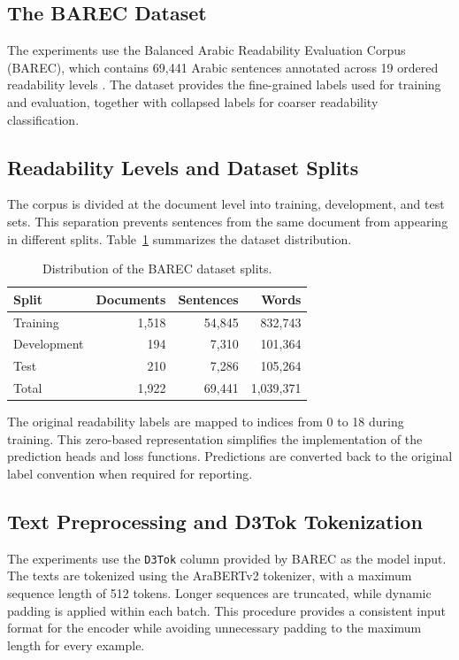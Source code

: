 \subsection{The BAREC Dataset}

The experiments use the Balanced Arabic Readability Evaluation Corpus (BAREC), which contains 69,441 Arabic sentences annotated across 19 ordered readability levels \cite{elmadani2025barec}. The dataset provides the fine-grained labels used for training and evaluation, together with collapsed labels for coarser readability classification.

\subsection{Readability Levels and Dataset Splits}

The corpus is divided at the document level into training, development, and test sets. This separation prevents sentences from the same document from appearing in different splits. Table~\ref{tab:meth-splits} summarizes the dataset distribution.

\begin{table}[htbp]
\centering
\caption{Distribution of the BAREC dataset splits.}
\label{tab:meth-splits}
\begin{tabular}{lrrr}
\toprule
\textbf{Split} & \textbf{Documents} & \textbf{Sentences} & \textbf{Words} \\
\midrule
Training    & 1,518 & 54,845 & 832,743 \\
Development &   194 &  7,310 & 101,364 \\
Test        &   210 &  7,286 & 105,264 \\
\midrule
Total       & 1,922 & 69,441 & 1,039,371 \\
\bottomrule
\end{tabular}
\end{table}

The original readability labels are mapped to indices from 0 to 18 during training. This zero-based representation simplifies the implementation of the prediction heads and loss functions. Predictions are converted back to the original label convention when required for reporting.

\subsection{Text Preprocessing and D3Tok Tokenization}

The experiments use the \texttt{D3Tok} column provided by BAREC as the model input. The texts are tokenized using the AraBERTv2 tokenizer, with a maximum sequence length of 512 tokens. Longer sequences are truncated, while dynamic padding is applied within each batch. This procedure provides a consistent input format for the encoder while avoiding unnecessary padding to the maximum length for every example.


